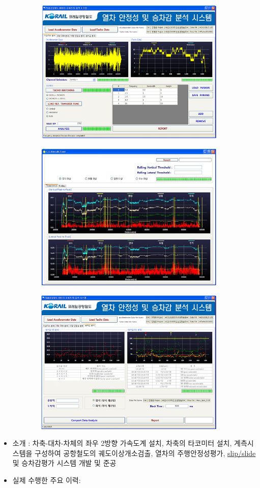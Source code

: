 \documentclass[10pt,a4paper,ragged2e]{altacv}
\begin{document}
\begin{fullwidth}
\divider

\begin{figure}[ht]
  \centering
  \begin{subfigure}[b]{0.3\textwidth}
    \includegraphics[width=0.3\linewidth] {images/arex_01.png}
    \label{fig:subject}
  \end{subfigure}
  \begin{subfigure}[b]{0.3\textwidth}
    \includegraphics[width=0.3\linewidth] {images/arex_02.png}
    \label{fig:subject}
  \end{subfigure}
  \begin{subfigure}[b]{0.3\textwidth}
    \includegraphics[width=0.3\linewidth] {images/arex_03.png}
    \label{fig:subject}
  \end{subfigure}
  \end{figure}
\begin{itemize}
\item 소개 : 차축-대차-차체의 좌우 2방향 가속도계 설치, 차축의 타코미터 설치, 계측시스템을 구성하여 공항철도의 궤도이상개소검출, 열차의 주행안정성평가, \href{http://ieeexplore.ieee.org/xpl/login.jsp?tp=\&arnumber=264942\&url=http\%3A\%2F\%2Fieeexplore.ieee.org\%2Fxpls\%2Fabs_all.jsp\%3Farnumber\%3D264942}{slip/slide} 및 승차감평가 시스템 개발 및 준공
\item 실제 수행한 주요 이력: 
\begin{itemize}

\end{itemize}
\end{itemize}
\end{fullwidth}
\end{document}
